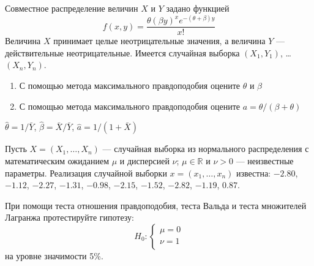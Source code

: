 \documentclass[pdftex,11pt,openany]{book}\usepackage[]{graphicx}\usepackage[]{color}
\begin{document}
\begin{solution}
\end{solution}


\begin{problem}
Совместное распределение величин $X$ и $Y$ задано функцией
\[
f(x,y)=\frac{\theta(\beta y)^x e^{-(\theta+\beta)y}}{x!}
\]
Величина $X$ принимает целые неотрицательные значения, а величина $Y$ --- действительные неотрицательные. Имеется случайная выборка $(X_1,Y_1)$, \ldots $(X_n,Y_n)$.
\begin{enumerate}
\item С помощью метода максимального правдоподобия оцените $\theta$ и $\beta$
\item С помощью метода максимального правдоподобия оцените $a=\theta/(\beta+\theta)$
\end{enumerate} 
\end{problem}

\begin{solution}
$\hat{\theta}=1/\bar{Y}$, $\hat{\beta}=\bar{X}/\bar{Y}$, $\hat{a}=1/(1+\bar{X})$
\end{solution}



\begin{problem}
Пусть $X = (X_1,\ldots,X_n)$ --- случайная выборка из нормального распределения с математическим ожиданием $\mu$ и дисперсией $\nu$; $\mu \in \mathbb{R}$ и $\nu >0$ --- неизвестные параметры. Реализация случайной выборки $x = (x_1,\ldots,x_n)$ известна: $-2.80$, $-1.12$, $-2.27$, $-1.31$, $-0.98$, $-2.15$, $-1.52$, $-2.82$, $-1.19$, $0.87$.


При помощи теста отношения правдоподобия, теста Вальда и теста множителей Лагранжа протестируйте гипотезу:
$$H_0: \begin{cases}
\mu = 0 \\
\nu = 1 \\
\end{cases}$$
на уровне значимости 5\%.
\end{problem}
\end{document}
